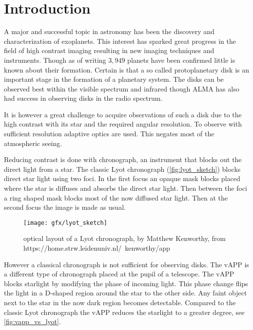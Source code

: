 
\chapter{Introduction} %

\label{ch:intro} %


A major and successful topic in astronomy has been the discovery and characterization of exoplanets. This interest has sparked great progress in the field of high contrast imaging resulting in new imaging techniques and instruments. Though as of writing $3,949$ planets have been confirmed little is known about their formation. Certain is that a so called protoplanetary disk is an important stage in the formation of a planetary system. The disks can be observed best within the visible spectrum and infrared though ALMA has also had success in observing disks in the radio spectrum. 

It is however a great challenge to acquire observations of such a disk due to the high contrast with its star and the required angular resolution. To observe with sufficient resolution adaptive optics are used. This negates most of the atmospheric seeing.

Reducing contrast is done with chronograph, an instrument that blocks out the direct light from a star. The classic Lyot chronograph (\autoref{fig:lyot_sketch}) blocks direct star light using two foci. In the first focus an opaque mask blocks placed where the star is diffuses and absorbs the direct star light. Then between the foci a ring shaped mask blocks most of the now diffused star light. Then at the second focus the image is made as usual.

\begin{figure}
    \texttt{[image: gfx/lyot\_sketch]}
    \caption{optical layout of a Lyot chronograph, by Matthew Kenworthy, from https://home.strw.leidenuniv.nl/~kenworthy/app}
    \label{fig:lyot_sketch}
\end {figure}

However a classical chronograph is not sufficient for observing disks. The \ac{vAPP} \cite{papervApp} is a different type of chronograph placed at the pupil of a telescope. The \ac{vAPP} blocks starlight by modifying the phase of incoming light. This phase change flips the light in a D-shaped region around the star to the other side. Any faint object next to the star in the now dark region becomes detectable. Compared to the classic Lyot chronograph the \ac{vAPP} reduces the starlight to a greater degree, see \autoref{fig:vapp_vs_lyot}.  

